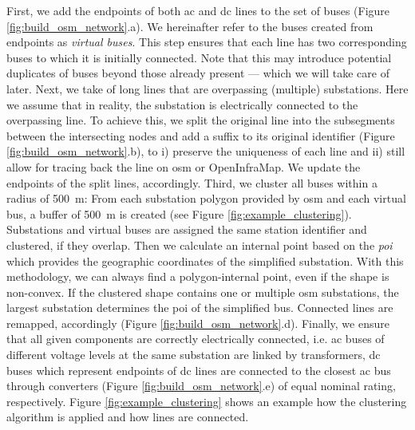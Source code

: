 \documentclass[fleqn,10pt]{wlscirep}
\let\autocite\cite
\begin{document}
First, we add the endpoints of both \acrshort{ac} and \acrshort{dc} lines to the set of buses (Figure \ref{fig:build_osm_network}.a). We hereinafter refer to the buses created from endpoints as \textit{virtual buses}. This step ensures that each line has two corresponding buses to which it is initially connected. Note that this may introduce potential duplicates of buses beyond those already present --- which we will take care of later. 
Next, we take of long lines that are overpassing (multiple) substations. Here we assume that in reality, the substation is electrically connected to the overpassing line. To achieve this, we split the original line into the subsegments between the intersecting nodes and add a suffix to its original identifier (Figure \ref{fig:build_osm_network}.b), to i) preserve the uniqueness of each line and ii) still allow for tracing back the line on \acrshort{osm} or OpenInfraMap.\autocite{garrettOpenInfrastructureMap2024} We update the endpoints of the split lines, accordingly. 
Third, we cluster all buses within a radius of \SI{500}{\meter}: From each substation polygon provided by \acrshort{osm} and each virtual bus, a buffer of \SI{500}{\meter} is created (see Figure \ref{fig:example_clustering}). Substations and virtual buses are assigned the same station identifier and clustered, if they overlap. Then we calculate an internal point based on the \textit{\gls{poi}}\cite{garcia-castellanosPolesInaccessibilityCalculation2007} which provides the geographic coordinates of the simplified substation. With this methodology, we can always find a polygon-internal point, even if the shape is non-convex. If the clustered shape contains one or multiple \acrshort{osm} substations, the largest substation determines the \acrshort{poi} of the simplified bus. Connected lines are remapped, accordingly (Figure \ref{fig:build_osm_network}.d). Finally, we ensure that all given components are correctly electrically connected, i.e. \acrshort{ac} buses of different voltage levels at the same substation are linked by transformers, \acrshort{dc} buses which represent endpoints of \acrshort{dc} lines are connected to the closest \acrshort{ac} bus through converters (Figure \ref{fig:build_osm_network}.e) of equal nominal rating, respectively. Figure \ref{fig:example_clustering} shows an example how the clustering algorithm is applied and how lines are connected.
\end{document}
